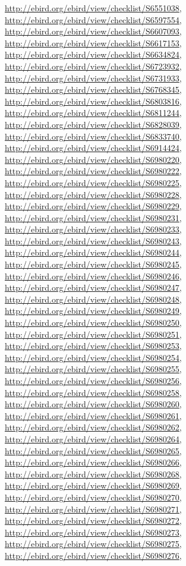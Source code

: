 \documentclass[9pt, article]{memoir}
\begin{document}
\begin{multicols}{2}
\url{http://ebird.org/ebird/view/checklist/S6551038}, 
\url{http://ebird.org/ebird/view/checklist/S6597554}, 
\url{http://ebird.org/ebird/view/checklist/S6607093}, 
\url{http://ebird.org/ebird/view/checklist/S6617153}, 
\url{http://ebird.org/ebird/view/checklist/S6634824}, 
\url{http://ebird.org/ebird/view/checklist/S6723932}, 
\url{http://ebird.org/ebird/view/checklist/S6731933}, 
\url{http://ebird.org/ebird/view/checklist/S6768345}, 
\url{http://ebird.org/ebird/view/checklist/S6803816}, 
\url{http://ebird.org/ebird/view/checklist/S6811244}, 
\url{http://ebird.org/ebird/view/checklist/S6828039}, 
\url{http://ebird.org/ebird/view/checklist/S6833740}, 
\url{http://ebird.org/ebird/view/checklist/S6914424}, 
\url{http://ebird.org/ebird/view/checklist/S6980220}, 
\url{http://ebird.org/ebird/view/checklist/S6980222}, 
\url{http://ebird.org/ebird/view/checklist/S6980225}, 
\url{http://ebird.org/ebird/view/checklist/S6980228}, 
\url{http://ebird.org/ebird/view/checklist/S6980229}, 
\url{http://ebird.org/ebird/view/checklist/S6980231}, 
\url{http://ebird.org/ebird/view/checklist/S6980233}, 
\url{http://ebird.org/ebird/view/checklist/S6980243}, 
\url{http://ebird.org/ebird/view/checklist/S6980244}, 
\url{http://ebird.org/ebird/view/checklist/S6980245}, 
\url{http://ebird.org/ebird/view/checklist/S6980246}, 
\url{http://ebird.org/ebird/view/checklist/S6980247}, 
\url{http://ebird.org/ebird/view/checklist/S6980248}, 
\url{http://ebird.org/ebird/view/checklist/S6980249}, 
\url{http://ebird.org/ebird/view/checklist/S6980250}, 
\url{http://ebird.org/ebird/view/checklist/S6980251}, 
\url{http://ebird.org/ebird/view/checklist/S6980253}, 
\url{http://ebird.org/ebird/view/checklist/S6980254}, 
\url{http://ebird.org/ebird/view/checklist/S6980255}, 
\url{http://ebird.org/ebird/view/checklist/S6980256}, 
\url{http://ebird.org/ebird/view/checklist/S6980258}, 
\url{http://ebird.org/ebird/view/checklist/S6980260}, 
\url{http://ebird.org/ebird/view/checklist/S6980261}, 
\url{http://ebird.org/ebird/view/checklist/S6980262}, 
\url{http://ebird.org/ebird/view/checklist/S6980264}, 
\url{http://ebird.org/ebird/view/checklist/S6980265}, 
\url{http://ebird.org/ebird/view/checklist/S6980266}, 
\url{http://ebird.org/ebird/view/checklist/S6980268}, 
\url{http://ebird.org/ebird/view/checklist/S6980269}, 
\url{http://ebird.org/ebird/view/checklist/S6980270}, 
\url{http://ebird.org/ebird/view/checklist/S6980271}, 
\url{http://ebird.org/ebird/view/checklist/S6980272}, 
\url{http://ebird.org/ebird/view/checklist/S6980273}, 
\url{http://ebird.org/ebird/view/checklist/S6980275}, 
\url{http://ebird.org/ebird/view/checklist/S6980276}, 

\end{multicols}
\end{document}

